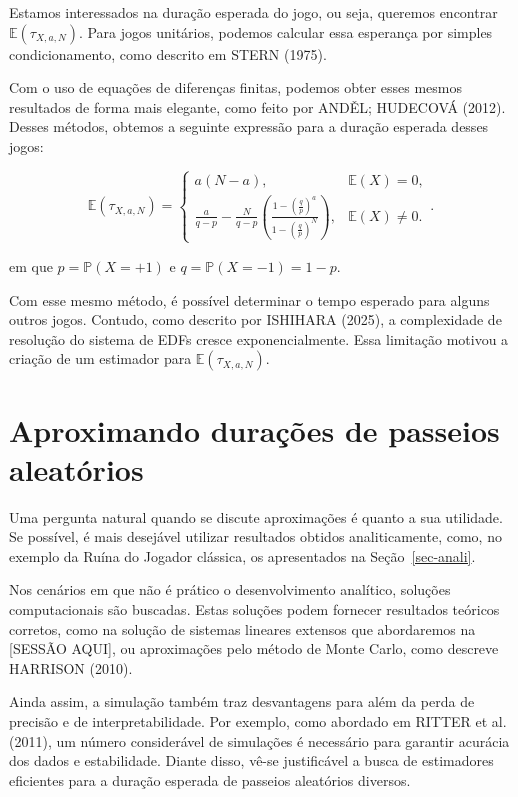 \documentclass[
  brazilian,
  12pt,
]{article}
\theoremstyle{definition}
\theoremstyle{definition}
\theoremstyle{remark}
\begin{document}
Estamos interessados na duração esperada do jogo, ou seja, queremos
encontrar \(\mathbb{E}(\tau_{X, a, N})\). Para jogos unitários, podemos
calcular essa esperança por simples condicionamento, como descrito em
STERN (1975).

Com o uso de equações de diferenças finitas, podemos obter esses mesmos
resultados de forma mais elegante, como feito por ANDĚL; HUDECOVÁ
(2012). Desses métodos, obtemos a seguinte expressão para a duração
esperada desses jogos:

\protect{}\label{eq-tempoteorico}
\[
\mathbb{E}(\tau_{X, a, N}) = \begin{cases}
a(N - a), & \mathbb{E}(X) = 0, \\
\frac{a}{q-p}-\frac{N}{q-p} \left( \frac{1- \left( \frac{q}{p} \right)^a}
        {1- \left( \frac{q}{p} \right)^N}\right), & \mathbb{E}(X) \neq 0.
\end{cases}.
\]

em que \(p = \mathbb{P}(X = +1)\) e \(q = \mathbb{P}(X = -1) = 1 - p\).

Com esse mesmo método, é possível determinar o tempo esperado para
alguns outros jogos. Contudo, como descrito por ISHIHARA (2025), a
complexidade de resolução do sistema de EDFs cresce exponencialmente.
Essa limitação motivou a criação de um estimador para
\(\mathbb{E}(\tau_{X, a, N})\).

\section{Aproximando durações de passeios
aleatórios}\label{aproximando-durauxe7uxf5es-de-passeios-aleatuxf3rios}

Uma pergunta natural quando se discute aproximações é quanto a sua
utilidade. Se possível, é mais desejável utilizar resultados obtidos
analiticamente, como, no exemplo da Ruína do Jogador clássica, os
apresentados na Seção~\ref{sec-anali}.

Nos cenários em que não é prático o desenvolvimento analítico, soluções
computacionais são buscadas. Estas soluções podem fornecer resultados
teóricos corretos, como na solução de sistemas lineares extensos que
abordaremos na {[}SESSÃO AQUI{]}, ou aproximações pelo método de Monte
Carlo, como descreve HARRISON (2010).

Ainda assim, a simulação também traz desvantagens para além da perda de
precisão e de interpretabilidade. Por exemplo, como abordado em RITTER
et al. (2011), um número considerável de simulações é necessário para
garantir acurácia dos dados e estabilidade. Diante disso, vê-se
justificável a busca de estimadores eficientes para a duração esperada
de passeios aleatórios diversos.
\end{document}
